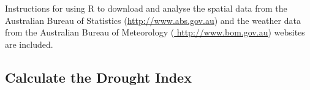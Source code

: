 \documentclass[a4paper]{article}                %
\begin{document}

        Instructions for using R to download and analyse the spatial data from the Australian Bureau of Statistics (\url{http://www.abs.gov.au}) and the weather data from the Australian Bureau of Meteorology (\url{ http://www.bom.gov.au}) websites are included.















\subsection{Calculate the Drought Index}
\end{document}
